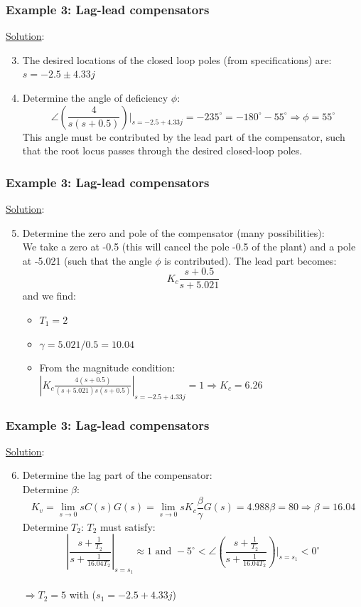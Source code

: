 \begin{frame}
	\frametitle{Example 3: Lag-lead compensators}
	\underline{Solution}:
	\begin{enumerate}
		\setcounter{enumi}{2}
		\item The desired locations of the closed loop poles (from specifications) are: $s=-2.5\pm4.33j$
		\item Determine the angle of deficiency $\phi$:
		$$\angle\left(\frac{4}{s(s+0.5)}\right)|_{s=-2.5+4.33j}=-235^{\circ}=-180^{\circ}-55^{\circ} \Rightarrow \phi=55^{\circ}$$
		This angle must be contributed by the lead part of the compensator, such that the root locus passes through the desired closed-loop poles. 
	\end{enumerate}
\end{frame}

\begin{frame}
	\frametitle{Example 3: Lag-lead compensators}
	\underline{Solution}:
	\begin{enumerate}
		\setcounter{enumi}{4}
		\item Determine the zero and pole of the compensator (many possibilities):\\
		We take a zero at -0.5 (this will cancel the pole -0.5 of the plant) and a pole at -5.021 (such that the angle $\phi$ is contributed).
		The lead part becomes:
		$$K_c\frac{s+0.5}{s+5.021}$$
		and we find:
		\begin{itemize}
			\item $T_1=2$
			\item $\gamma=5.021/0.5=10.04$
			\item From the magnitude condition: \\
			$|K_c\frac{4(s+0.5)}{(s+5.021)s(s+0.5)}|_{s=-2.5+4.33j}=1 \Rightarrow K_c=6.26$
		\end{itemize}
	\end{enumerate}
\end{frame}

\begin{frame}
	\frametitle{Example 3: Lag-lead compensators}
	\underline{Solution}:
	\begin{enumerate}
		\setcounter{enumi}{5}
		\item Determine the lag part of the compensator:\\
		Determine $\beta$:
		$$K_v=\lim_{s \to 0}sC(s)G(s)=\lim_{s\to0}sK_c\frac{\beta}{\gamma}G(s)=4.988\beta=80 \Rightarrow \beta=16.04$$
		Determine $T_2$: $T_2$ must satisfy:
		$$|\frac{s+\frac{1}{T_2}}{s+\frac{1}{16.04T_2}}|_{s=s_1}\approx1 \text{ and } -5^{\circ}<\angle\left(\frac{s+\frac{1}{T_2}}{s+\frac{1}{16.04T_2}}\right)|_{s=s_1}<0^{\circ}$$\\
		 $\Rightarrow T_2=5$ with ($s_1=-2.5+4.33j$)
	\end{enumerate}
\end{frame}

